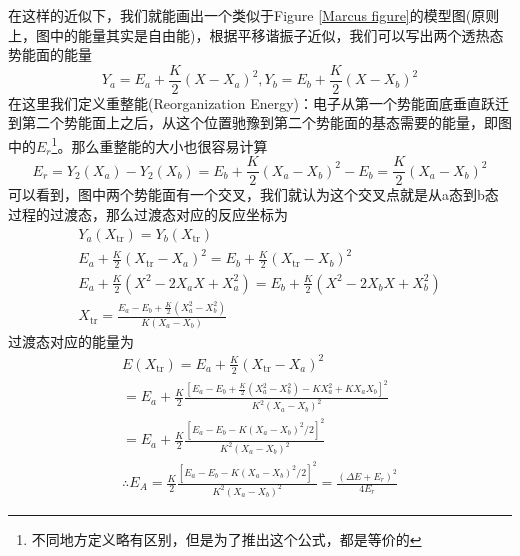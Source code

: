 \documentclass[12pt,a4paper,openany,twoside]{book}
\numberwithin{equation}{section}
\begin{document}
        在这样的近似下，我们就能画出一个类似于Figure \ref{Marcus figure}的模型图(原则上，图中的能量其实是自由能)，根据平移谐振子近似，我们可以写出两个透热态势能面的能量
        \begin{equation*}
          Y_{a}=E_{a}+\frac{K}{2}\left(X-X_{a}\right)^{2}, Y_{b}=E_{b}+\frac{K}{2}\left(X-X_{b}\right)^{2}
        \end{equation*}
        在这里我们定义重整能(Reorganization Energy)：电子从第一个势能面底垂直跃迁到第二个势能面上之后，从这个位置驰豫到第二个势能面的基态需要的能量，即图中的$E_r$\footnote{不同地方定义略有区别，但是为了推出这个公式，都是等价的}。那么重整能的大小也很容易计算
        \begin{equation*}
          E_{r}=Y_{2}\left(X_{a}\right)-Y_{2}\left(X_{b}\right)=E_{b}+\frac{K}{2}\left(X_{a}-X_{b}\right)^{2}-E_{b}=\frac{K}{2}\left(X_{a}-X_{b}\right)^{2}
        \end{equation*}
        可以看到，图中两个势能面有一个交叉，我们就认为这个交叉点就是从a态到b态过程的过渡态，那么过渡态对应的反应坐标为
        \begin{equation*}
          \begin{array}{c}{Y_{a}\left(X_{\mathrm{tr}}\right)=Y_{b}\left(X_{\mathrm{tr}}\right)} \\ {E_{a}+\frac{K}{2}\left(X_{\mathrm{tr}}-X_{a}\right)^{2}=E_{b}+\frac{K}{2}\left(X_{\mathrm{tr}}-X_{b}\right)^{2}} \\ {E_{a}+\frac{K}{2}\left(X^{2}-2 X_{a} X+X_{a}^{2}\right)=E_{b}+\frac{K}{2}\left(X^{2}-2 X_{b} X+X_{b}^{2}\right)} \\ {X_{\mathrm{tr}}=\frac{E_{a}-E_{b}+\frac{K}{2}\left(X_{a}^{2}-X_{b}^{2}\right)}{K\left(X_{a}-X_{b}\right)}}\end{array}
        \end{equation*}
        过渡态对应的能量为
        \begin{equation*}
          \begin{array}{l}{E\left(X_{\mathrm{tr}}\right)=E_{a}+\frac{K}{2}\left(X_{\mathrm{tr}}-X_{a}\right)^{2}} \\ {=E_{a}+\frac{K}{2} \frac{\left[E_{a}-E_{b}+\frac{K}{2}\left(X_{a}^{2}-X_{b}^{2}\right)-K X_{a}^{2}+K X_{a} X_{b}\right]^{2}}{K^{2}\left(X_{a}-X_{b}\right)^{2}}} \\ {=E_{a}+\frac{K}{2} \frac{\left[E_{a}-E_{b}-K\left(X_{a}-X_{b}\right)^{2} / 2\right]^{2}}{K^{2}\left(X_{a}-X_{b}\right)^{2}}} \\ {\therefore E_{A}=\frac{K}{2} \frac{\left[E_{a}-E_{b}-K\left(X_{a}-X_{b}\right)^{2} / 2\right]^{2}}{K^{2}\left(X_{a}-X_{b}\right)^{2}}=\frac{\left(\Delta E+E_{r}\right)^{2}}{4 E_{r}}}\end{array}
        \end{equation*}
\end{document}
